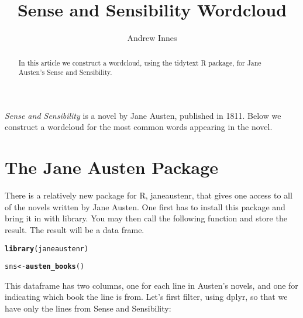 \documentclass{article}\usepackage[]{graphicx}\usepackage[]{color}
\makeatletter
\newcommand{\hlstd}[1]{\textcolor[rgb]{0.345,0.345,0.345}{#1}}%
\newcommand{\hlkwb}[1]{\textcolor[rgb]{0.69,0.353,0.396}{#1}}%
\newcommand{\hlkwd}[1]{\textcolor[rgb]{0.737,0.353,0.396}{\textbf{#1}}}%
\newenvironment{kframe}{%
 \def\at@end@of@kframe{}%
 \ifinner\ifhmode%
  \def\at@end@of@kframe{\end{minipage}}%
  \begin{minipage}{\columnwidth}%
 \fi\fi%
 \def\FrameCommand##1{\hskip\@totalleftmargin \hskip-\fboxsep
 \colorbox{shadecolor}{##1}\hskip-\fboxsep
     \hskip-\linewidth \hskip-\@totalleftmargin \hskip\columnwidth}%
 \MakeFramed {\advance\hsize-\width
   \@totalleftmargin\z@ \linewidth\hsize
   \@setminipage}}%
 {\par\unskip\endMakeFramed%
 \at@end@of@kframe}
\newenvironment{knitrout}{}{} %
\makeatother
\begin{document}
\title{Sense and Sensibility Wordcloud}
\author{Andrew Innes}
\maketitle

\begin{abstract}
In this article we construct a wordcloud, using the tidytext R package, for Jane Austen's Sense and Sensibility.

\end{abstract}

\textit{Sense and Sensibility} is a novel by Jane Austen, published in 1811.  Below we construct a wordcloud for the most common words appearing in the novel.

\section{The Jane Austen Package}
There is a relatively new package for R, janeaustenr, that gives one access to all of the novels written by Jane Austen.  One first has to install this package and bring it in with library.  You may then call the following function and store the result.  The result will be a data frame.

\begin{knitrout}
\color{fgcolor}\begin{kframe}
\begin{alltt}
\hlkwd{library}\hlstd{(janeaustenr)}
\end{alltt}


{\ttfamily\noindent\color{warningcolor}{\#\# Warning: package 'janeaustenr' was built under R version 3.4.2}}\begin{alltt}
\hlstd{sns}\hlkwb{<-}\hlkwd{austen_books}\hlstd{()}
\end{alltt}
\end{kframe}
\end{knitrout}

This dataframe has two columns, one for each line in Austen's novels, and one for indicating which book the line is from.  Let's first filter, using dplyr, so that we have only the lines from Sense and Sensibility:
\end{document}
